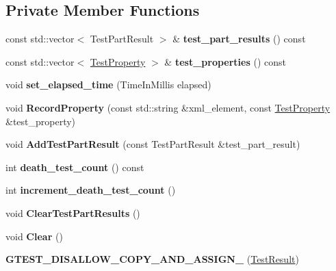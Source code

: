 \subsection*{Private Member Functions}
\begin{DoxyCompactItemize}
\item 
\mbox{\label{classtesting_1_1_test_result_a2964c3a12ef6ef9bcb47599374514432}} 
const std\+::vector$<$ Test\+Part\+Result $>$ \& {\bfseries test\+\_\+part\+\_\+results} () const
\item 
\mbox{\label{classtesting_1_1_test_result_a8c94e8e89c616abe5d33024a6b54f218}} 
const std\+::vector$<$ \mbox{\hyperlink{classtesting_1_1_test_property}{Test\+Property}} $>$ \& {\bfseries test\+\_\+properties} () const
\item 
\mbox{\label{classtesting_1_1_test_result_aa345325e5dea41609d17d7c614bf2b18}} 
void {\bfseries set\+\_\+elapsed\+\_\+time} (Time\+In\+Millis elapsed)
\item 
\mbox{\label{classtesting_1_1_test_result_ac253b0fd7ea70f457e9517e415eac32d}} 
void {\bfseries Record\+Property} (const std\+::string \&xml\+\_\+element, const \mbox{\hyperlink{classtesting_1_1_test_property}{Test\+Property}} \&test\+\_\+property)
\item 
\mbox{\label{classtesting_1_1_test_result_ac28e9821ad3e9314c4fe41b119c5b44d}} 
void {\bfseries Add\+Test\+Part\+Result} (const Test\+Part\+Result \&test\+\_\+part\+\_\+result)
\item 
\mbox{\label{classtesting_1_1_test_result_a827cb78135ac375d81d89ffedc3eca52}} 
int {\bfseries death\+\_\+test\+\_\+count} () const
\item 
\mbox{\label{classtesting_1_1_test_result_a07faaa1d16a991f34222d02e10c75dc2}} 
int {\bfseries increment\+\_\+death\+\_\+test\+\_\+count} ()
\item 
\mbox{\label{classtesting_1_1_test_result_aa11ed718e0a76a39e6380e5ddce7cae2}} 
void {\bfseries Clear\+Test\+Part\+Results} ()
\item 
\mbox{\label{classtesting_1_1_test_result_a5371bc2e69435b4cb1fdad9ca81759a6}} 
void {\bfseries Clear} ()
\item 
\mbox{\label{classtesting_1_1_test_result_ad04e1d5d9eb623ba1d9fc82cdff43af4}} 
{\bfseries G\+T\+E\+S\+T\+\_\+\+D\+I\+S\+A\+L\+L\+O\+W\+\_\+\+C\+O\+P\+Y\+\_\+\+A\+N\+D\+\_\+\+A\+S\+S\+I\+G\+N\+\_\+} (\mbox{\hyperlink{classtesting_1_1_test_result}{Test\+Result}})
\end{DoxyCompactItemize}
